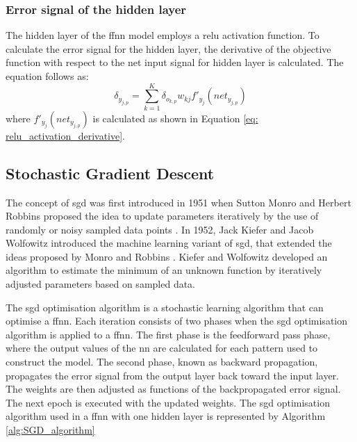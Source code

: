 \documentclass[10pt, conference]{IEEEtran}
\begin{document}
\subsubsection{Error signal of the hidden layer}

The hidden layer of the \acrshort{ffnn} model employs a \acrshort{relu} activation function. To calculate the error
signal for the hidden layer, the derivative of the objective function with respect to the net input signal
for hidden layer is calculated. The equation follows as:
\begin{equation}
    \delta_{y_{j,p}} = \sum_{k=1}^{K} \delta_{o_{k,p}} w_{kj} f'_{y_j}(net_{y_{j,p}}) \label{eq: relu_error_signal}
\end{equation}
where $f'_{y_j}(net_{y_{j,p}})$ is calculated as shown in Equation \ref{eq: relu_activation_derivative}.

\subsection{Stochastic Gradient Descent} \label{section: SGD_background}

The concept of \acrshort{sgd} was first introduced in 1951 when Sutton Monro and Herbert Robbins proposed the idea
to update parameters iteratively by the use of randomly or noisy sampled data points \cite{sgd_ref_1}. In 1952,
Jack Kiefer and Jacob Wolfowitz introduced the machine learning variant of \acrshort{sgd}, that extended the ideas
proposed by Monro and Robbins \cite{sgd_ref_2}. Kiefer and Wolfowitz developed an algorithm to estimate the minimum of an unknown
function by iteratively adjusted parameters based on sampled data.

The \acrshort{sgd} optimisation algorithm is a stochastic learning algorithm that can optimise a \acrshort{ffnn}.
Each iteration consists of two phases when the \acrshort{sgd} optimisation algorithm is applied to a \acrshort{ffnn}. The
first phase is the feedforward pass phase, where the output values of the \acrshort{nn} are calculated
for each pattern used to construct the model. The second phase, known as backward propagation, propagates the error
signal from the output layer back toward the input layer. The weights are then adjusted as functions of the
backpropagated error signal. The next epoch is executed with the updated weights. The \acrshort{sgd} optimisation
algorithm used in a \acrshort{ffnn} with one hidden layer is represented by Algorithm \ref{alg:SGD_algorithm}
\end{document}
